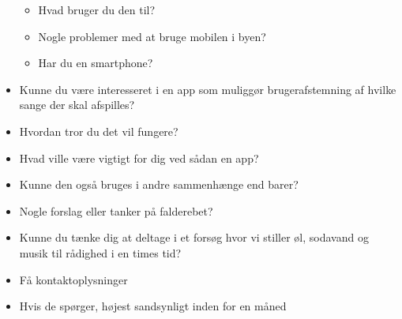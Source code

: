 \begin{itemize}
  \begin{itemize}
  \itemsep1pt\parskip0pt
  \item
    Hvad bruger du den til?
  \item
    Nogle problemer med at bruge mobilen i byen?
  \item
    Har du en smartphone?
  \end{itemize}
\item
  Kunne du være interesseret i en app som muliggør brugerafstemning af
  hvilke sange der skal afspilles?
\item
  Hvordan tror du det vil fungere?
\item
  Hvad ville være vigtigt for dig ved sådan en app?
\item
  Kunne den også bruges i andre sammenhænge end barer?
\item
  Nogle forslag eller tanker på falderebet?
\item
  Kunne du tænke dig at deltage i et forsøg hvor vi stiller øl, sodavand
  og musik til rådighed i en times tid?
\item
  Få kontaktoplysninger
\item
  Hvis de spørger, højest sandsynligt inden for en måned
\end{itemize}
